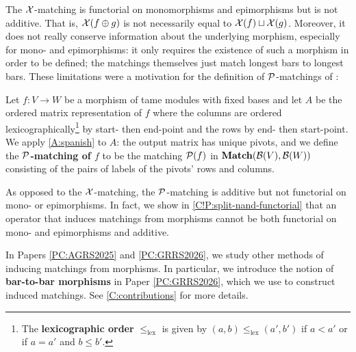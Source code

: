 The $\mathcal{X}$-matching is functorial on monomorphisms and epimorphisms \cite[Proposition 5.7]{BauerLesnick2015} but is not additive. That is, $\mathcal{X}(f \oplus g)$ is not necessarily equal to $\mathcal{X}(f) \sqcup \mathcal{X}(g)$. Moreover, it does not really conserve information about the underlying morphism, especially for mono- and epimorphisms: it only requires the existence of such a morphism in order to be defined; the matchings themselves just match longest bars to longest bars. These limitations were a motivation for the definition of $\mathcal{P}$-matchings of \cite{GST2025}:

\begin{definition}
  Let $f \colon V \to W$ be a morphism of tame modules with fixed bases and let $A$ be the ordered matrix representation of $f$ where the columns are ordered lexicographically\footnote{The \textbf{lexicographic order} $\leq_{\text{lex}}$ is given by $(a, b) \leq_{\text{lex}} (a', b')$ if $a < a'$ or if $a = a'$ and $b \leq b'$.} by start- then end-point and the rows by end- then start-point. We apply \cref{A:spanish} to $A$: the output matrix has unique pivots, and we define the \textbf{$\mathcal{P}$-matching of $f$} to be the matching $\mathcal{P}(f)$ in $\operatorname{\mathbf{Match}}(\mathcal{B}(V), \mathcal{B}(W))$ consisting of the pairs of labels of the pivots' rows and columns.
\end{definition}

\begin{algorithm}[tbp]
\caption{Reduction algorithm from \cite{GST2025}.}
\label{A:spanish}

\end{algorithm}

As opposed to the $\mathcal{X}$-matching, the $\mathcal{P}$-matching is additive but not functorial on mono- or epimorphisms. In fact, we show in \cref{C!P:split-nand-functorial} that an operator that induces matchings from morphisms cannot be both functorial on mono- and epimorphisms and additive.

In Papers \ref{PC:AGRS2025} and \ref{PC:GRRS2026}, we study other methods of inducing matchings from morphisms. In particular, we introduce the notion of \textbf{bar-to-bar morphisms} in Paper \ref{PC:GRRS2026}, which we use to construct induced matchings. See \cref{C:contributions} for more details.